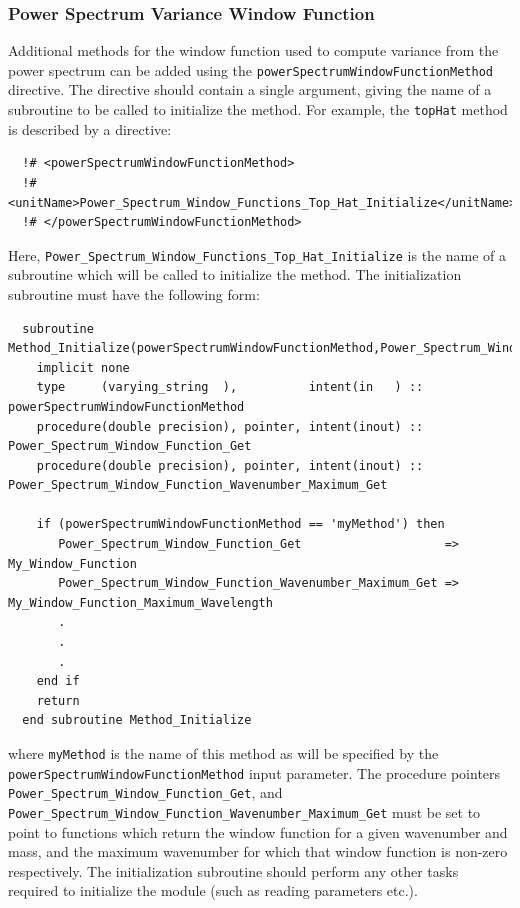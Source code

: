 \subsubsection{Power Spectrum Variance Window Function}\label{sec:PowerSpectrumWindowFunction}

Additional methods for the window function used to compute variance from the power spectrum can be added using the {\tt powerSpectrumWindowFunctionMethod} directive. The directive should contain a single argument, giving the name of a subroutine to be called to initialize the method. For example, the {\tt topHat} method is described by a directive:
\begin{verbatim}
  !# <powerSpectrumWindowFunctionMethod>
  !#  <unitName>Power_Spectrum_Window_Functions_Top_Hat_Initialize</unitName>
  !# </powerSpectrumWindowFunctionMethod>
\end{verbatim}
Here, {\tt Power\_Spectrum\_Window\_Functions\_Top\_Hat\_Initialize} is the name of a subroutine which will be called to initialize the method. The initialization subroutine must have the following form:
\begin{verbatim}
  subroutine Method_Initialize(powerSpectrumWindowFunctionMethod,Power_Spectrum_Window_Function_Get)
    implicit none
    type     (varying_string  ),          intent(in   ) :: powerSpectrumWindowFunctionMethod
    procedure(double precision), pointer, intent(inout) :: Power_Spectrum_Window_Function_Get
    procedure(double precision), pointer, intent(inout) :: Power_Spectrum_Window_Function_Wavenumber_Maximum_Get
    
    if (powerSpectrumWindowFunctionMethod == 'myMethod') then
       Power_Spectrum_Window_Function_Get                    => My_Window_Function
       Power_Spectrum_Window_Function_Wavenumber_Maximum_Get => My_Window_Function_Maximum_Wavelength
       .
       .
       .
    end if
    return
  end subroutine Method_Initialize
\end{verbatim}
where {\tt myMethod} is the name of this method as will be specified by the {\tt powerSpectrumWindowFunctionMethod} input parameter. The procedure pointers {\tt Power\_Spectrum\_Window\_Function\_Get}, and {\tt Power\_Spectrum\_Window\_Function\_Wavenumber\_Maximum\_Get} must be set to point to functions which return the window function for a given wavenumber and mass, and the maximum wavenumber for which that window function is non-zero respectively. The initialization subroutine should perform any other tasks required to initialize the module (such as reading parameters etc.).

